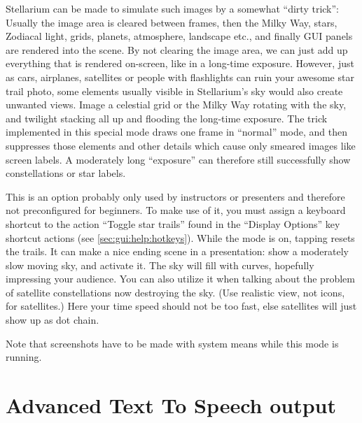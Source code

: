 Stellarium can be made to simulate such images by a somewhat ``dirty trick'': Usually the image area is cleared between frames, 
then the Milky Way, stars, Zodiacal light, grids, planets, atmosphere, landscape etc., and finally GUI panels are rendered into the scene. 
By not clearing the image area, we can just add up everything that is rendered on-screen, like in a long-time exposure. 
However, just as cars, airplanes, satellites or people with flashlights can ruin your awesome star trail photo, 
some elements usually visible in Stellarium's sky would also create unwanted views. 
Image a celestial grid or the Milky Way rotating with the sky, and twilight stacking all up and flooding the long-time exposure. 
The trick implemented in this special mode draws one frame in ``normal'' mode, and then suppresses those elements and other details 
which cause only smeared images like screen labels. A moderately long ``exposure'' can therefore still successfully show constellations or star labels.  

This is an option probably only used by instructors or presenters and therefore not preconfigured for beginners. 
To make use of it, you must assign a keyboard shortcut to the action ``Toggle star trails''
found in the ``Display Options'' key shortcut actions (see \ref{sec:gui:help:hotkeys}). 
While the mode is on, tapping  resets the trails. 
It can make a nice ending scene in a presentation: show a moderately slow moving sky, and activate it.  
The sky will fill with curves, hopefully impressing your audience. 
You can also utilize it when talking about the problem of satellite constellations now destroying the sky. (Use realistic view, not icons, for satellites.) 
Here your time speed should not be too fast, else satellites will just show up as dot chain. 

Note that screenshots have to be made with system means while this mode is running. 


\iffalse



\section{Advanced Text To Speech output}
\label{sec:CommandLineOptions:Special:TTS-Piper}

